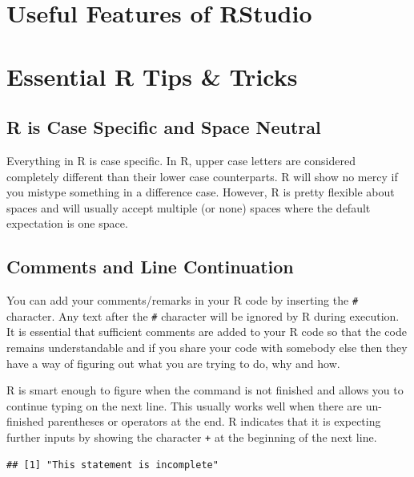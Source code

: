 \documentclass[11pt, letterpaper, twoside]{memoir}\usepackage{knitr}
\begin{document}
\section{Useful Features of RStudio}


\section{Essential R Tips \& Tricks}

\subsection{R is Case Specific and Space Neutral}

Everything in R is case specific. In R, upper case letters are considered completely different than their lower case counterparts. R will show no mercy if you mistype something in a difference case. However, R is pretty flexible about spaces and will usually accept multiple (or none) spaces where the default expectation is one space. 

\subsection{Comments and Line Continuation}

You can add your comments/remarks in your R code by inserting the \verb|#| character. Any text after the \verb|#| character will be ignored by R during execution. It is essential that sufficient comments are added to your R code so that the code remains understandable and if you share your code with somebody else then they have a way of figuring out what you are trying to do, why and how.

R is smart enough to figure when the command is not finished and allows you to continue typing on the next line. This usually works well when there are un-finished parentheses or operators at the end. R indicates that it is expecting further inputs by showing the character \texttt{+} at the beginning of the next line. 

\begin{knitrout}
\color{fgcolor}\begin{kframe}
\begin{alltt}
\hlstd{(}\hlstd{)}  
\end{alltt}
\begin{verbatim}
## [1] "This statement is incomplete"
\end{verbatim}
\end{kframe}
\end{knitrout}
\end{document}
